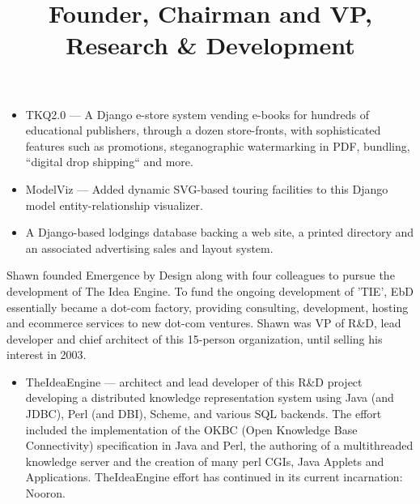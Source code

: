 \begin{resume}
\begin{position}
\begin{itemize}
  \item TKQ2.0 --- A Django e-store system vending e-books for hundreds
  of educational publishers, through a dozen store-fronts, with sophisticated 
  features such as promotions, steganographic watermarking in PDF, bundling,
  ``digital drop shipping`` and more.

  \item ModelViz --- Added dynamic SVG-based touring facilities to this Django
 model entity-relationship visualizer.

  \item A Django-based lodgings database backing a web site, a printed directory and an associated advertising sales and layout system.

\end{itemize}

\end{position}




\title{ Founder, Chairman and VP, Research \& Development }

\begin{position}
  Shawn founded Emergence by Design along with four colleagues to pursue
  the development of The Idea Engine.  To fund the ongoing development of
  'TIE', EbD essentially became a dot-com factory, providing consulting,
  development, hosting and ecommerce services to new dot-com ventures.
  Shawn was VP of R\&D, lead developer and chief architect of this 15-person
  organization, until selling his interest in 2003.

\begin{itemize}

\item TheIdeaEngine --- architect and lead developer of this R\&D project developing a distributed
  knowledge representation system using Java (and JDBC), Perl (and DBI), Scheme, and various SQL backends.  
  The effort included the
  implementation of the OKBC (Open Knowledge Base Connectivity)
  specification in Java and Perl,
  the authoring of a multithreaded knowledge server
  and the creation of many perl CGIs, Java Applets and Applications.
  TheIdeaEngine effort has continued in its current incarnation: Nooron.


\end{itemize}
\end{position}
\end{resume}
